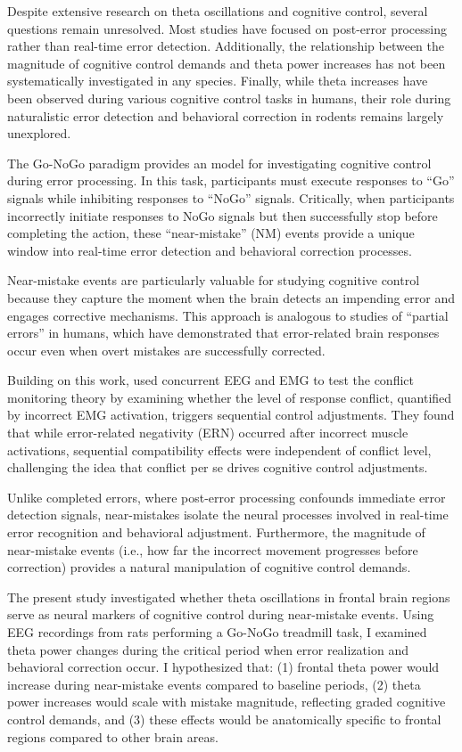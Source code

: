 \documentclass[11pt]{article}
\begin{document}
Despite extensive research on theta oscillations and cognitive control, several questions remain unresolved. Most studies have focused on post-error processing rather than real-time error detection. Additionally, the relationship between the magnitude of cognitive control demands and theta power increases has not been systematically investigated in any species. Finally, while theta increases have been observed during various cognitive control tasks in humans, their role during naturalistic error detection and behavioral correction in rodents remains largely unexplored.

The Go-NoGo paradigm provides an model for investigating cognitive control during error processing. In this task, participants must execute responses to ``Go'' signals while inhibiting responses to ``NoGo'' signals. Critically, when participants incorrectly initiate responses to NoGo signals but then successfully stop before completing the action, these ``near-mistake'' (NM) events provide a unique window into real-time error detection and behavioral correction processes.

Near-mistake events are particularly valuable for studying cognitive control because they capture the moment when the brain detects an impending error and engages corrective mechanisms. This approach is analogous to studies of ``partial errors'' in humans, which have demonstrated that error-related brain responses occur even when overt mistakes are successfully corrected.

Building on this work, \citet{burle2005sequential} used concurrent EEG and EMG to test the conflict monitoring theory by examining whether the level of response conflict, quantified by incorrect EMG activation, triggers sequential control adjustments. They found that while error-related negativity (ERN) occurred after incorrect muscle activations, sequential compatibility effects were independent of conflict level, challenging the idea that conflict per se drives cognitive control adjustments.

Unlike completed errors, where post-error processing confounds immediate error detection signals, near-mistakes isolate the neural processes involved in real-time error recognition and behavioral adjustment. Furthermore, the magnitude of near-mistake events (i.e., how far the incorrect movement progresses before correction) provides a natural manipulation of cognitive control demands.

The present study investigated whether theta oscillations in frontal brain regions serve as neural markers of cognitive control during near-mistake events. Using EEG recordings from rats performing a Go-NoGo treadmill task, I examined theta power changes during the critical period when error realization and behavioral correction occur. I hypothesized that: (1) frontal theta power would increase during near-mistake events compared to baseline periods, (2) theta power increases would scale with mistake magnitude, reflecting graded cognitive control demands, and (3) these effects would be anatomically specific to frontal regions compared to other brain areas.
\end{document}
